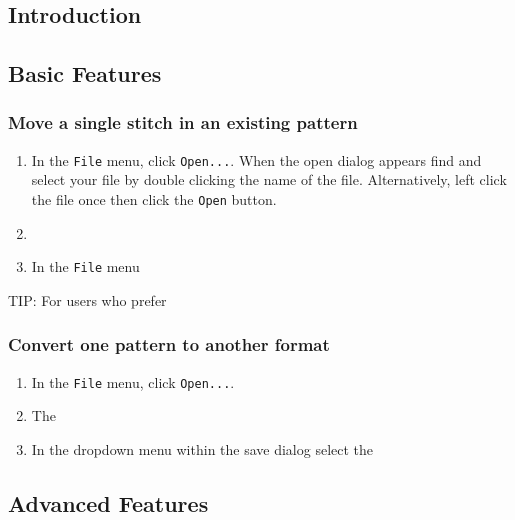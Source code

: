 \documentclass[a4paper, 11pt]{report}
\begin{document}
\hypertarget{introduction}{%
\subsection{Introduction}\label{introduction}}

\hypertarget{basic-features}{%
\subsection{Basic Features}\label{basic-features}}

\hypertarget{move-a-single-stitch-in-an-existing-pattern}{%
\subsubsection{Move a single stitch in an existing
pattern}\label{move-a-single-stitch-in-an-existing-pattern}}

\begin{enumerate}
\def\labelenumi{\arabic{enumi}.}
\item
  In the \texttt{File} menu, click \texttt{Open...}. When the open
  dialog appears find and select your file by double clicking the name
  of the file. Alternatively, left click the file once then click the
  \texttt{Open} button.
\item
\item
  In the \texttt{File} menu
\end{enumerate}

TIP: For users who prefer

\hypertarget{convert-one-pattern-to-another-format}{%
\subsubsection{Convert one pattern to another
format}\label{convert-one-pattern-to-another-format}}

\begin{enumerate}
\def\labelenumi{\arabic{enumi}.}
\item
  In the \texttt{File} menu, click \texttt{Open...}.
\item
  The
\item
  In the dropdown menu within the save dialog select the
\end{enumerate}

\hypertarget{advanced-features}{%
\subsection{Advanced Features}\label{advanced-features}}
\end{document}
